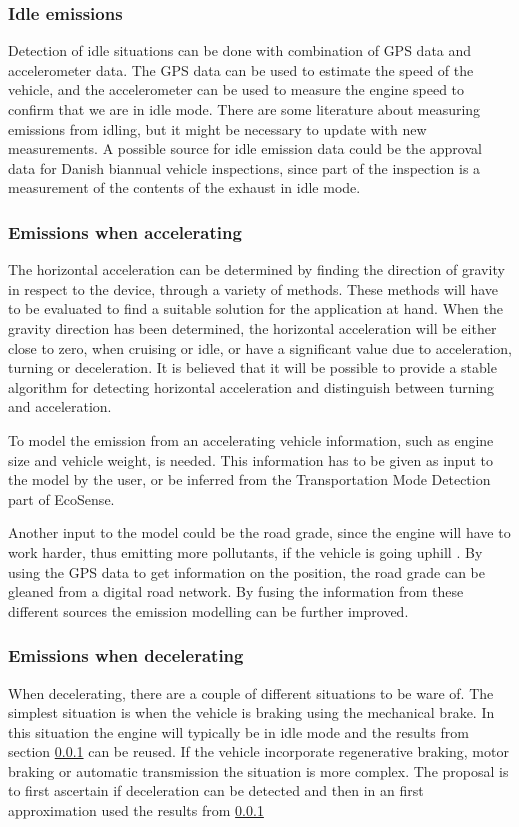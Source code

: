 \subsubsection{Idle emissions}\label{Idle}
Detection of idle situations can be done with combination of GPS data and accelerometer data. The GPS data can be used to estimate the speed of the vehicle, and the accelerometer can be used to measure the engine speed to confirm that we are in idle mode. There are some literature about measuring emissions from idling, but it might be necessary to update with new measurements. A possible source for idle emission data could be the approval data for Danish biannual vehicle inspections, since part of the inspection is a measurement of the contents of the exhaust in idle mode.

\subsubsection{Emissions when accelerating}
The horizontal acceleration can be determined by finding the direction of gravity in respect to the device, through a variety of methods. These methods will have to be evaluated to find a suitable solution for the application at hand.
When the gravity direction has been determined, the horizontal acceleration will be either close to zero, when cruising or idle, or have a significant value due to acceleration, turning or deceleration. It is believed that it will be possible to provide a stable algorithm for detecting horizontal acceleration and distinguish between turning and acceleration.

To model the emission from an accelerating vehicle information, such as engine size and vehicle weight, is needed. This information has to be given as input to the model by the user, or be inferred from the Transportation Mode Detection part of EcoSense.

Another input to the model could be the road grade, since the engine will have to work harder, thus emitting more pollutants, if the vehicle is going uphill \cite{kaul2013}. By using the GPS data to get information on the position, the road grade can be gleaned from a digital road network. By fusing the information from these different sources the emission modelling  can be further improved.  

\subsubsection{Emissions when decelerating}
When decelerating, there are a couple of different situations to be ware of. The simplest situation is when the vehicle is braking using the mechanical brake. In this situation the engine will typically be in idle mode and the results from section \ref{Idle} can be reused. If the vehicle incorporate regenerative braking, motor braking or automatic transmission the situation is more complex. The proposal is to first ascertain if deceleration can be detected and then in an first approximation used the results from \ref{Idle}

